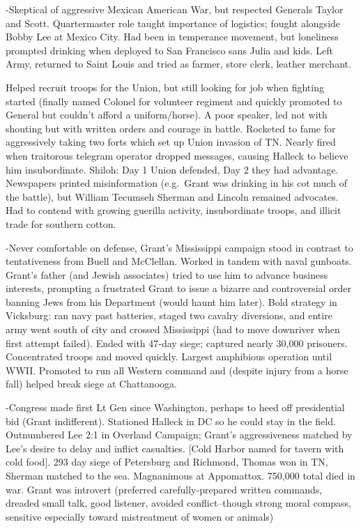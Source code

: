 \documentclass[
]{article}
\begin{document}
-Skeptical of aggressive Mexican American War, but respected Generals
Taylor and Scott. Quartermaster role taught importance of logistics;
fought alongside Bobby Lee at Mexico City. Had been in temperance
movement, but loneliness prompted drinking when deployed to San
Francisco sans Julia and kids. Left Army, returned to Saint Louis and
tried as farmer, store clerk, leather merchant.

Helped recruit troops for the Union, but still looking for job when
fighting started (finally named Colonel for volunteer regiment and
quickly promoted to General but couldn't afford a uniform/horse). A poor
speaker, led not with shouting but with written orders and courage in
battle. Rocketed to fame for aggressively taking two forts which set up
Union invasion of TN. Nearly fired when traitorous telegram operator
dropped messages, causing Halleck to believe him insubordinate. Shiloh:
Day 1 Union defended, Day 2 they had advantage. Newspapers printed
misinformation (e.g.~Grant was drinking in his cot much of the battle),
but William Tecumseh Sherman and Lincoln remained advocates. Had to
contend with growing guerilla activity, insubordinate troops, and
illicit trade for southern cotton.

-Never comfortable on defense, Grant's Mississippi campaign stood in
contrast to tentativeness from Buell and McClellan. Worked in tandem
with naval gunboats. Grant's father (and Jewish associates) tried to use
him to advance business interests, prompting a frustrated Grant to issue
a bizarre and controversial order banning Jews from his Department
(would haunt him later). Bold strategy in Vicksburg: ran navy past
batteries, staged two cavalry diversions, and entire army went south of
city and crossed Mississippi (had to move downriver when first attempt
failed). Ended with 47-day siege; captured nearly 30,000 prisoners.
Concentrated troops and moved quickly. Largest amphibious operation
until WWII. Promoted to run all Western command and (despite injury from
a horse fall) helped break siege at Chattanooga.

-Congress made first Lt Gen since Washington, perhaps to heed off
presidential bid (Grant indifferent). Stationed Halleck in DC so he
could stay in the field. Outnumbered Lee 2:1 in Overland Campaign;
Grant's aggressiveness matched by Lee's desire to delay and inflict
casualties. {[}Cold Harbor named for tavern with cold food{]}. 293 day
siege of Petersburg and Richmond, Thomas won in TN, Sherman matched to
the sea. Magnanimous at Appomattox. 750,000 total died in war. Grant was
introvert (preferred carefully-prepared written commands, dreaded small
talk, good listener, avoided conflict--though strong moral compass,
sensitive especially toward mistreatment of women or animals)
\end{document}
